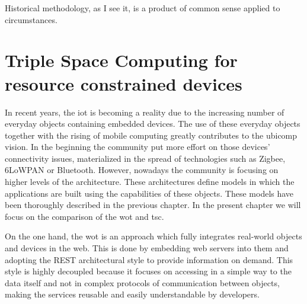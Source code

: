 

\begin{savequote}[50mm]
Historical methodology, as I see it, is a product of common sense applied to circumstances. 
\end{savequote}


\newcommand{\codigo}[1]{``\texttt{#1}''}
\newcommand{\primquery}{\emph{query}}
\newcommand{\primread}{\emph{read}}
\newcommand{\primtake}{\emph{take}}
\newcommand{\primwrite}{\emph{write}}


\chapter{Triple Space Computing for resource constrained devices}
\label{cha:tsc}
\newcommand{\pathchapthree}{3_tsc}

\ifpdf
    \graphicspath{{\pathchapthree/figures/PNG/}{\pathchapthree/figures/PDF/}{\pathchapthree/figures/}}
\else
    \graphicspath{{\pathchapthree/figures/EPS/}{\pathchapthree/figures/}}
\fi




In recent years, the \acf{iot} is becoming a reality due to the increasing number of everyday objects containing embedded devices.
The use of these everyday objects together with the rising of mobile computing greatly contributes to the \ac{ubicomp} vision.
In the beginning the community put more effort on those devices' connectivity issues, materialized in the spread of technologies such as Zigbee, 6LoWPAN or Bluetooth.
However, nowadays the community is focusing on higher levels of the architecture.
These architectures define models in which the applications are built using the capabilities of these objects.
These models have been thoroughly described in the previous chapter.
In the present chapter we will focus on the comparison of the \acf{wot} and \acf{tsc}.

On the one hand, the \ac{wot} is an approach which fully integrates real-world objects and devices in the web.
This is done by embedding web servers into them and adopting the REST architectural style to provide information on demand.
This style is highly decoupled because it focuses on accessing in a simple way to the data itself and not in complex protocols of communication between objects, making the services reusable and easily understandable by developers.

